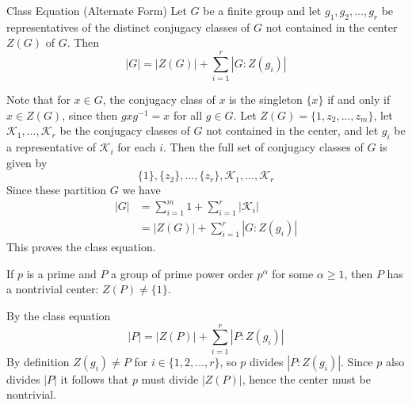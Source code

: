 \documentclass[12pt, a4paper, twoside, openright, titlepage]{book}
\begin{document}
\begin{namthm}{Class Equation (Alternate Form)}{}
    Let $G$ be a finite group and let $g_1,g_2,...,g_r$ be representatives of the distinct conjugacy classes of $G$ not contained in the center $Z(G)$ of $G$. Then \begin{equation*}
        |G| = |Z(G)| + \sum\limits_{i=1}^r|G:Z(g_i)|
    \end{equation*}
\end{namthm}
\begin{proof*}{}{}
    Note that for $x \in G$, the conjugacy class of $x$ is the singleton $\{x\}$ if and only if $x \in Z(G)$, since then $gxg^{-1} = x$ for all $g \in G$. Let $Z(G) = \{1,z_2,...,z_m\}$, let $\mathcal{K}_1,...,\mathcal{K}_r$ be the conjugacy classes of $G$ not contained in the center, and let $g_i$ be a representative of $\mathcal{K}_i$ for each $i$. Then the full set of conjugacy classes of $G$ is given by \begin{equation*}
        \{1\},\{z_2\},...,\{z_r\},\mathcal{K}_1,...,\mathcal{K}_r
    \end{equation*}
    Since these partition $G$ we have \begin{align*} 
        |G| &= \sum\limits_{i=1}^m1 + \sum\limits_{i=1}^r|\mathcal{K}_i| \\
        &= |Z(G)| + \sum\limits_{i=1}^r|G:Z(g_i)|
    \end{align*}
    This proves the class equation.
\end{proof*}

\begin{thm}{}{}
    If $p$ is a prime and $P$ a group of prime power order $p^{\alpha}$ for some $\alpha \geq 1$, then $P$ has a nontrivial center: $Z(P) \neq \{1\}$.
\end{thm}
\begin{proof*}{}{}
    By the class equation \begin{equation*}
        |P| = |Z(P)| + \sum\limits_{i=1}^r|P:Z(g_i)|
    \end{equation*}
    By definition $Z(g_i) \neq P$ for $i \in \{1,2,...,r\}$, so $p$ divides $|P:Z(g_i)|$. Since $p$ also divides $|P|$ it follows that $p$ must divide $|Z(P)|$, hence the center must be nontrivial.
\end{proof*}
\end{document}
